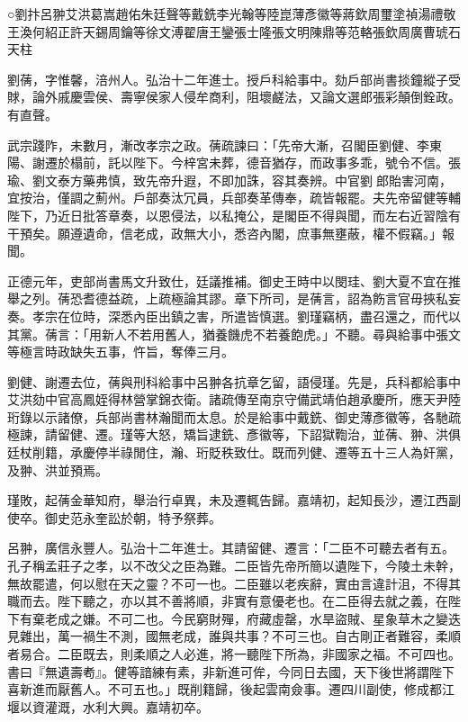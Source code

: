 
\begin{pinyinscope}
○劉抃呂翀艾洪葛嵩趙佑朱廷聲等戴銑李光翰等陸崑薄彥徽等蔣欽周璽塗禎湯禮敬王渙何紹正許天錫周鑰等徐文溥翟唐王鑾張士隆張文明陳鼎等范輅張欽周廣曹琥石天柱

劉蒨，字惟馨，涪州人。弘治十二年進士。授戶科給事中。劾戶部尚書掞鐘縱子受賕，論外戚慶雲侯、壽寧侯家人侵牟商利，阻壞鹺法，又論文選郎張彩顛倒銓政。有直聲。

武宗踐阼，未數月，漸改孝宗之政。蒨疏諫曰：「先帝大漸，召閣臣劉健、李東陽、謝遷於榻前，託以陛下。今梓宮未葬，德音猶存，而政事多乖，號令不信。張瑜、劉文泰方藥弗慎，致先帝升遐，不即加誅，容其奏辨。中官劉郎貽害河南，宜按治，僅調之薊州。戶部奏汰冗員，兵部奏革傳奉，疏皆報罷。夫先帝留健等輔陛下，乃近日批答章奏，以恩侵法，以私掩公，是閣臣不得與聞，而左右近習陰有干預矣。願遵遺命，信老成，政無大小，悉咨內閣，庶事無壅蔽，權不假竊。」報聞。

正德元年，吏部尚書馬文升致仕，廷議推補。御史王時中以閔珪、劉大夏不宜在推舉之列。蒨恐耆德益疏，上疏極論其謬。章下所司，是蒨言，詔為飭言官毋挾私妄奏。孝宗在位時，深悉內臣出鎮之害，所遣皆慎選。劉瑾竊柄，盡召還之，而代以其黨。蒨言：「用新人不若用舊人，猶養饑虎不若養飽虎。」不聽。尋與給事中張文等極言時政缺失五事，忤旨，奪俸三月。

劉健、謝遷去位，蒨與刑科給事中呂翀各抗章乞留，語侵瑾。先是，兵科都給事中艾洪劾中官高鳳姪得林營掌錦衣衛。諸疏傳至南京守備武靖伯趙承慶所，應天尹陸珩錄以示諸僚，兵部尚書林瀚聞而太息。於是給事中戴銑、御史薄彥徽等，各馳疏極諫，請留健、遷。瑾等大怒，矯旨逮銑、彥徽等，下詔獄鞫治，並蒨、翀、洪俱廷杖削籍，承慶停半祿閒住，瀚、珩貶秩致仕。既而列健、遷等五十三人為奸黨，及翀、洪並預焉。

瑾敗，起蒨金華知府，舉治行卓異，未及遷輒告歸。嘉靖初，起知長沙，遷江西副使卒。御史范永奎訟於朝，特予祭葬。

呂翀，廣信永豐人。弘治十二年進士。其請留健、遷言：「二臣不可聽去者有五。孔子稱孟莊子之孝，以不改父之臣為難。二臣皆先帝所簡以遺陛下，今陵土未幹，無故罷遣，何以慰在天之靈？不可一也。二臣雖以老疾辭，實由言違計沮，不得其職而去。陛下聽之，亦以其不善將順，非實有意優老也。在二臣得去就之義，在陛下有棄老成之嫌。不可二也。今民窮財殫，府藏虛罄，水旱盜賊、星象草木之變迭見雜出，萬一禍生不測，國無老成，誰與共事？不可三也。自古剛正者難容，柔順者易合。二臣既去，則柔順之人必進，將一聽陛下所為，非國家之福。不可四也。書曰『無遺壽耇』。健等諳練有素，非新進可侔，今同日去國，天下後世將謂陛下喜新進而厭舊人。不可五也。」既削籍歸，後起雲南僉事。遷四川副使，修成都江堰以資灌溉，水利大興。嘉靖初卒。


\end{pinyinscope}

